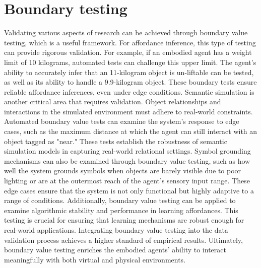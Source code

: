 \documentclass[11pt]{article}
\begin{document}
\section{Boundary testing}
 Validating various aspects of research can be achieved through boundary value testing, which is a useful framework. For affordance inference, this type of testing can provide rigorous validation. For example, if an embodied agent has a weight limit of 10 kilograms, automated tests can challenge this upper limit. The agent's ability to accurately infer that an 11-kilogram object is un-liftable can be tested, as well as its ability to handle a 9.9-kilogram object. These boundary tests ensure reliable affordance inferences, even under edge conditions. Semantic simulation is another critical area that requires validation. Object relationships and interactions in the simulated environment must adhere to real-world constraints. Automated boundary value tests can examine the system's response to edge cases, such as the maximum distance at which the agent can still interact with an object tagged as "near." These tests establish the robustness of semantic simulation models in capturing real-world relational settings. Symbol grounding mechanisms can also be examined through boundary value testing, such as how well the system grounds symbols when objects are barely visible due to poor lighting or are at the outermost reach of the agent's sensory input range. These edge cases ensure that the system is not only functional but highly adaptive to a range of conditions. Additionally, boundary value testing can be applied to examine algorithmic stability and performance in learning affordances. This testing is crucial for ensuring that learning mechanisms are robust enough for real-world applications. Integrating boundary value testing into the data validation process achieves a higher standard of empirical results. Ultimately, boundary value testing enriches the embodied agents' ability to interact meaningfully with both virtual and physical environments.
\end{document}
